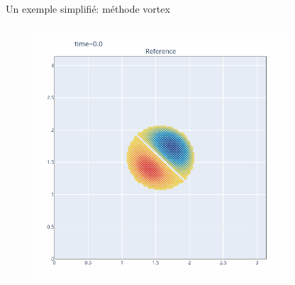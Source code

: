 \documentclass[aspectratio=169]{beamer} %
\begin{document}
\begin{frame}{Un exemple simplifié: méthode vortex~\footnotemark[1]}
\begin{columns}[t]
\begin{column}{0.5\textwidth}
\begin{figure}
                {\includegraphics[width=0.85\textwidth]{../../conference/images/dipole_particles/dipole_particles-0.png}}
            \end{figure}
        \end{column}
    \end{columns}
\end{frame}
\end{document}
